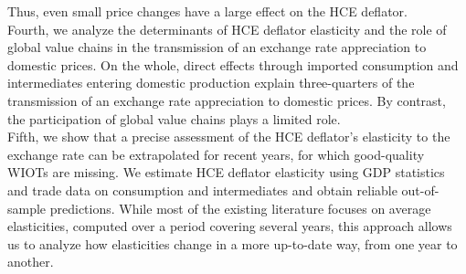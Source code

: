 \documentclass[11pt,a4paper]{paper} %
\begin{document}
Thus, even small price changes have a large effect on the HCE deflator. \\
Fourth, we analyze the determinants of HCE deflator elasticity and the role of global value chains in the transmission of an exchange rate appreciation to domestic prices.
On the whole, direct effects through imported consumption and intermediates entering domestic production explain three-quarters of the transmission of an exchange rate appreciation to domestic prices.
By contrast, the participation of global value chains plays a limited role. \\
Fifth, we show that a precise assessment of the HCE deflator's elasticity to the exchange rate can be extrapolated for recent years, for which good-quality WIOTs are missing. 
We estimate HCE deflator elasticity using GDP statistics and trade data on consumption and intermediates and obtain reliable out-of-sample predictions.
While most of the existing literature focuses on average elasticities, computed over a period covering several years, this approach allows us to analyze how elasticities change in a more up-to-date way, from one year to another. 
\end{document}
